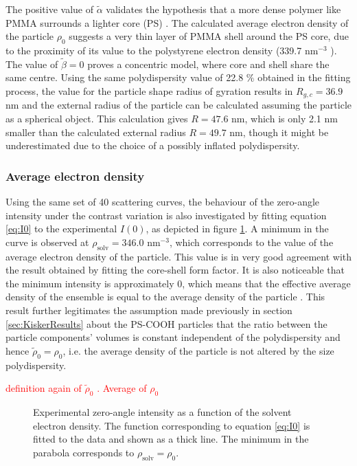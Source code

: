 The positive value of \(\tilde\alpha\) validates the hypothesis that a more dense polymer like PMMA surrounds a lighter core (PS) \citep{stuhrmann_small-angle_2008}. The calculated average electron density of the particle \(\rho_0\) suggests a very thin layer of PMMA shell around the PS core, due to the proximity of its value to the polystyrene electron density (339.7 nm\(^{-3}\) ). The value of \( \tilde\beta=0\) proves a concentric model, where core and shell share the same centre. Using the same polydispersity value of 22.8 $\%$ obtained in the fitting process, the value for the particle shape radius of gyration results in \(R_{g,c}=36.9\) nm and the external radius of the particle can be calculated assuming the particle as a spherical object. This calculation gives \( R=47.6\) nm, which is only 2.1 nm smaller than the calculated external radius \(R=49.7\) nm, though it might be underestimated due to the choice of a possibly inflated polydispersity. 

\subsubsection{Average electron density}
Using the same set of 40 scattering curves, the behaviour of the zero-angle intensity under the contrast variation is also investigated by fitting equation \eqref{eq:I0} to the experimental \(I(0)\), as depicted in figure \ref{fig:KiskerIntensityParabola}. A minimum in the curve is observed at \(\rho_{\text{solv}}=346.0\) nm\(^{-3}\), which corresponds to the value of the average electron density of the particle. This value is in very good agreement with the result obtained by fitting the core-shell form factor. It is also noticeable that the minimum intensity is approximately 0, which means that the effective average density of the ensemble is equal to the average density of the particle \citep{avdeev_contrast_2007}. This result further legitimates the assumption made previously in section \ref{sec:KiskerResults} about the PS-COOH particles that the ratio between the particle components' volumes is constant independent of the polydispersity and hence \(  \tilde \rho_0 = \rho_0  \), i.e. the average density of the particle is not altered by the size polydispersity.

\textcolor{red}{definition again of  $\tilde \rho_0$ . Average of  $\rho_0$ }

\begin{figure}%
	\centering
		
		\caption[Zero-angle intensity of the PS-COOH particles.]{Experimental zero-angle intensity as a function of the solvent electron density. The function corresponding to equation \eqref{eq:I0} is fitted to the data and shown as a thick line. The minimum in the parabola corresponds to $\rho_{\text{solv}}=\rho_0$.}
		\label{fig:KiskerIntensityParabola}
\end{figure}

